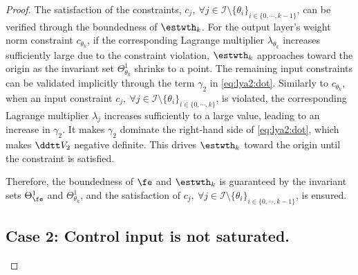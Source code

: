 \documentclass[letterpaper, journal]{IEEEtran}
\begin{document}
\begin{proof}
The satisfaction of the constraints, \ie $c_j,\ \forall j\in\mathcal{I}\setminus \{\theta_i\}_{i\in\{0,\cdots,k-1\}}$, can be verified through the boundedness of $\estwth_k$.
For the output layer's weight norm constraint $c_{\theta_k}$, if the corresponding Lagrange multiplier $\lambda_{\theta_k}$ increases sufficiently large due to the constraint violation, $\estwth_k$ approaches toward the origin as the invariant set $\Theta_{\theta_k}^{1}$ shrinks to a point.
The remaining input constraints can be validated implicitly through the term ${\gamma}_2$ in \eqref{eq:lya2:dot}.
Similarly to $c_{\theta_k}$, when an input constraint $c_j,\ \forall j\in\mathcal{I}\setminus \{\theta_i\}_{i\in\{0,\cdots,k\}}$, is violated, the corresponding Lagrange multiplier $\lambda_j$ increases sufficiently to a large value, leading to an increase in ${\gamma}_2$.
It makes ${\gamma}_2$ dominate the right-hand side of \eqref{eq:lya2:dot}, which makes $\ddtt V_2$ negative definite.
This drives $\estwth_k$ toward the origin until the constraint is satisfied.

Therefore, the boundedness of $\fe$ and $\estwth_k$ is guaranteed by the invariant sets $\Theta_{\fe}^{1}$ and $\Theta_{\theta_k}^{1}$, and the satisfaction of $c_j,\ \forall j\in\mathcal{I}\setminus \{\theta_i\}_{i\in\{0,\cdots,k-1\}}$, is ensured.

\subsection*{Case 2: Control input is not saturated.}


\end{proof}
\end{document}
